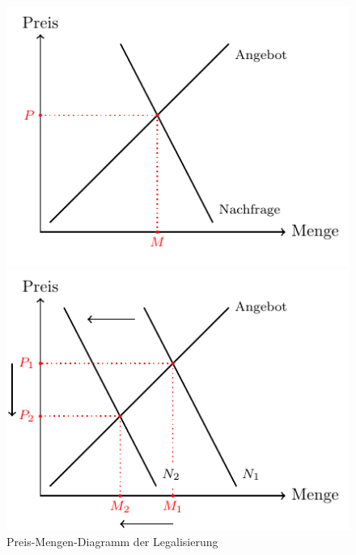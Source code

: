 \documentclass[../main.tex]{subfiles}
\begin{document}
	 \begin{figure}[H]
	 \centering
	 \begin{minipage}{0.48\linewidth}
	 	\centering
		\includegraphics[width=\textwidth]{../figures/priceelasticity-equilibrium}
	 \end{minipage} 
	 \hfill
	 \begin{minipage}{0.48\linewidth}
	 	\centering
		\includegraphics[width=\textwidth]{../figures/priceelasticity-prevention}
	 \end{minipage}
	 \captionsetup{font=small}
	 \caption[Preis-Mengen-Diagramm der Legalisierung]{Preis-Mengen-Diagramm der Legalisierung\protect\footnotemark}\label{fig:equilibrium-legalization}
	 \end{figure}	 
	 
\end{document}
